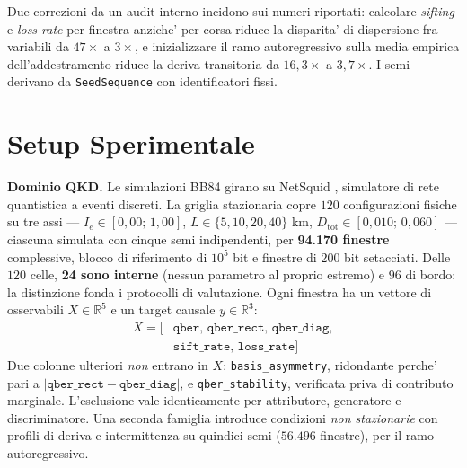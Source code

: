 \documentclass[10pt,conference,a4paper,twocolumn]{IEEEtran}
\begin{document}
Due correzioni da un audit interno incidono sui numeri riportati: calcolare \textit{sifting} e \textit{loss rate} per finestra anziche' per corsa riduce la disparita' di dispersione fra variabili da $47\times$ a $3\times$, e inizializzare il ramo autoregressivo sulla media empirica dell'addestramento riduce la deriva transitoria da $16{,}3\times$ a $3{,}7\times$. I semi derivano da \texttt{SeedSequence} con identificatori fissi.

\section{Setup Sperimentale}

\textbf{Dominio QKD.} Le simulazioni BB84 girano su NetSquid \cite{netsquid}, simulatore di rete quantistica a eventi discreti. La griglia stazionaria copre $120$ configurazioni fisiche su tre assi — $I_e \in [0{,}00;\, 1{,}00]$, $L \in \{5, 10, 20, 40\}$ km, $D_{\text{tot}} \in [0{,}010;\, 0{,}060]$ — ciascuna simulata con cinque semi indipendenti, per \textbf{94.170 finestre} complessive, blocco di riferimento di $10^5$ bit e finestre di $200$ bit setacciati. Delle $120$ celle, \textbf{24 sono interne} (nessun parametro al proprio estremo) e $96$ di bordo: la distinzione fonda i protocolli di valutazione. Ogni finestra ha un vettore di osservabili $X \in \mathbb{R}^5$ e un target causale $y \in \mathbb{R}^3$:
\begin{equation}
    \begin{split}
        X = \big[ &\texttt{qber},\, \texttt{qber\_rect},\, \texttt{qber\_diag}, \\
                  &\texttt{sift\_rate},\, \texttt{loss\_rate} \big]
    \end{split}
\end{equation}
Due colonne ulteriori \emph{non} entrano in $X$: \texttt{basis\_asymmetry}, ridondante perche' pari a $|\texttt{qber\_rect} - \texttt{qber\_diag}|$, e \texttt{qber\_stability}, verificata priva di contributo marginale. L'esclusione vale identicamente per attributore, generatore e discriminatore. Una seconda famiglia introduce condizioni \emph{non stazionarie} con profili di deriva e intermittenza su quindici semi ($56.496$ finestre), per il ramo autoregressivo.
\end{document}
